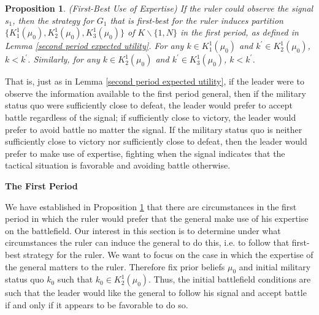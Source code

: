 \documentclass[11pt,]{article}
\newtheorem{proposition}[]{Proposition}
\begin{document}
\begin{proposition} (First-Best Use of Expertise) If the ruler could observe the signal $s_1$, then the strategy for $G_1$ that is first-best for the ruler induces partition $\{K^1_1(\mu_0),K^1_2(\mu_0),K^1_3(\mu_0)\}$ of $K\backslash\{1,N\}$ in the first period, as defined in Lemma \ref{second period expected utility}.  For any $k\in K_1^1(\mu_0)$ and $k^{\prime}\in K_2^1(\mu_0)$, $k<k^{\prime}$.  Similarly, for any $k\in K_2^1(\mu_0)$ and $k^{\prime}\in K_3^1(\mu_0)$, $k<k^{\prime}$.
\label{firstbest}
\end{proposition}\noindent That is, just as in Lemma \ref{second period expected utility}, if the leader were to observe the information available to the first period general, then if the military status quo were sufficiently close to defeat, the leader would prefer to accept battle regardless of the signal; if sufficiently close to victory, the leader would prefer to avoid battle no matter the signal.  If the military status quo is neither sufficiently close to victory nor sufficiently close to defeat, then the leader would prefer to make use of expertise, fighting when the signal indicates that the tactical situation is favorable and avoiding battle otherwise.


\begin{center}
\textbf{\Large{The First Period}}\normalsize\\
\end{center}We have established in Proposition \ref{firstbest} that there are circumstances in the first period in which the ruler would prefer that the general make use of his expertise on the battlefield.  Our interest in this section is to determine under what circumstances the ruler can induce the general to do this, i.e. to follow that first-best strategy for the ruler.  We want to focus on the case in which the expertise of the general matters to the ruler.  Therefore fix prior beliefs $\mu_0$ and initial military status quo $k_0$ such that $k_0\in K_2^1(\mu_0)$.  Thus, the initial battlefield conditions are such that the leader would like the general to follow his signal and accept battle if and only if it appears to be favorable to do so.  
\end{document}
